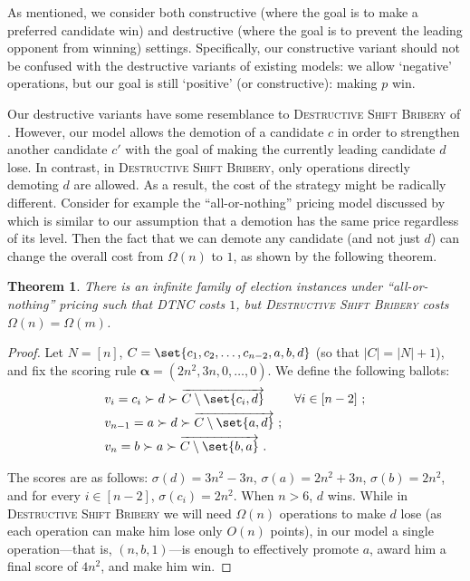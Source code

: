 \documentclass[letterpaper]{article} %
\newtheorem{theorem}{Theorem}
\newcommand{\vecgreek}{\bm}
\newcommand{\veca}{\vecgreek{\alpha}}
\newcommand{\DTNC}{\textsc{DTNC}}
\newcommand{\shiftB}{\textsc{Shift Bribery}}
\newcommand{\DshiftB}{\textsc{Destructive} \shiftB{}}
\newcommand{\ora}[1]{\overrightarrow{#1}}
\newcommand{\abs}[1]{\lvert{#1}\rvert}
\begin{document}
As mentioned, we consider both constructive (where the goal is to make a preferred candidate win) and destructive (where the goal is to prevent the leading opponent from winning) settings. Specifically,  our constructive variant should not be confused with the destructive variants of existing models: we allow `negative' operations, but our goal is still `positive' (or constructive): making $p$ win.

Our destructive variants have some resemblance to \DshiftB{} of \citet{Kaczmarczyk2019destructive}. However, our model allows the demotion of a candidate $c$ in order to strengthen another candidate $c'$ with the goal of making the currently leading candidate $d$ lose. In contrast, in \DshiftB, only operations directly demoting $d$ are allowed. As a result, the cost of the strategy might be radically different. Consider for example the ``all-or-nothing'' pricing model discussed by \citet{Kaczmarczyk2019destructive} which is similar to our assumption that a demotion has the same price regardless of its level. Then the fact that we can demote any candidate (and not just $d$) can change the overall cost from $\Omega(n)$ to $1$, as shown by the following theorem.
\begin{theorem} There is an infinite family of election instances under ``all-or-nothing'' pricing   such that \DTNC{} costs $1$, but 
\DshiftB{} costs $\Omega(n)=\Omega(m)$.
\end{theorem}
\begin{proof}
Let $N = [n]$, $C = \set{c_1, c_2, \dots, c_{n-2}, a,b, d}$    (so that $\abs{C} = \abs{N}+1 $), and fix the  scoring rule $\veca=(2n^2, 3n,0,\ldots,0)$. We define the following ballots:
\begin{align*}
&v_i = c_i \succ d \succ \ora{C\setminus \set{c_i, d}} &\forall i \in  [n-2]\ ;\\
&v_{n-1} = a \succ d \succ \ora{C\setminus \set{a, d}}\ ;\\
&v_{n} = b \succ a \succ \ora{C\setminus \set{b,a}}\ .
\end{align*}

The scores are as follows: $\sigma(d) = 3n^2 -3n$, $\sigma(a) = 2n^2 + 3n$, $\sigma(b) = 2n^2$,  and for every $i \in  [n-2]$, $\sigma(c_i) = 2n^2$. When $n > 6$, $d$ wins. While in \DshiftB{} we will need $\Omega(n)$ operations to make $d$ lose (as each operation can make him lose only $O(n)$ points), in our model a single operation---that is, $(n, b, 1)$---is enough to effectively promote $a$, award him a final score of $4n^2$, and make him win.
\end{proof}
\end{document}
